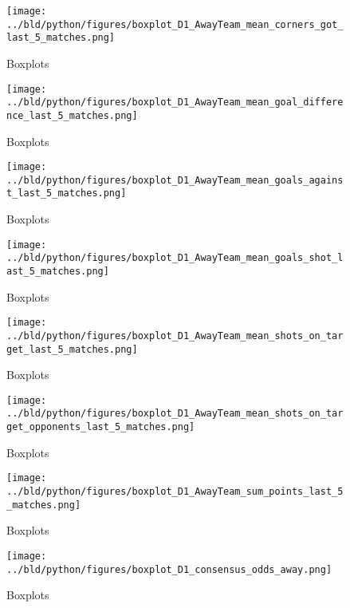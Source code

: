 \documentclass[11pt, a4paper, leqno]{article}
\begin{document}
\begin{figure}[H]
    \centering
    \texttt{[image: ../bld/python/figures/boxplot\_D1\_AwayTeam\_mean\_corners\_got\_last\_5\_matches.png]}
    \caption{Boxplots}
    \label{fig:figure2}
\end{figure}


\begin{figure}[H]
    \centering
    \texttt{[image: ../bld/python/figures/boxplot\_D1\_AwayTeam\_mean\_goal\_difference\_last\_5\_matches.png]}
    \caption{Boxplots}
    \label{fig:figure2}
\end{figure}

\begin{figure}[H]
    \centering
    \texttt{[image: ../bld/python/figures/boxplot\_D1\_AwayTeam\_mean\_goals\_against\_last\_5\_matches.png]}
    \caption{Boxplots}
    \label{fig:figure2}
\end{figure}

\begin{figure}[H]
    \centering
    \texttt{[image: ../bld/python/figures/boxplot\_D1\_AwayTeam\_mean\_goals\_shot\_last\_5\_matches.png]}
    \caption{Boxplots}
    \label{fig:figure2}
\end{figure}

\begin{figure}[H]
    \centering
    \texttt{[image: ../bld/python/figures/boxplot\_D1\_AwayTeam\_mean\_shots\_on\_target\_last\_5\_matches.png]}
    \caption{Boxplots}
    \label{fig:figure2}
\end{figure}

\begin{figure}[H]
    \centering
    \texttt{[image: ../bld/python/figures/boxplot\_D1\_AwayTeam\_mean\_shots\_on\_target\_opponents\_last\_5\_matches.png]}
    \caption{Boxplots}
    \label{fig:figure2}
\end{figure}

\begin{figure}[H]
    \centering
    \texttt{[image: ../bld/python/figures/boxplot\_D1\_AwayTeam\_sum\_points\_last\_5\_matches.png]}
    \caption{Boxplots}
    \label{fig:figure2}
\end{figure}

\begin{figure}[H]
    \centering
    \texttt{[image: ../bld/python/figures/boxplot\_D1\_consensus\_odds\_away.png]}
    \caption{Boxplots}
    \label{fig:figure2}
\end{figure}
\end{document}
